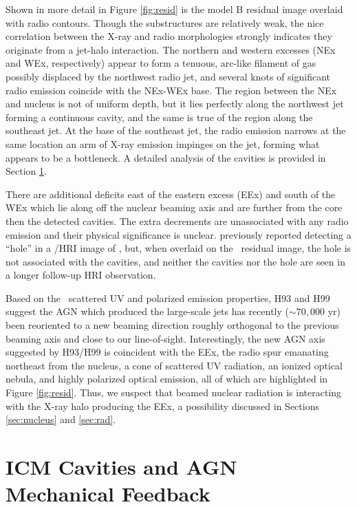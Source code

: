 \documentclass[useAMS,usenatbib]{mn2e}
\begin{document}
Shown in more detail in Figure \ref{fig:resid} is the model B residual
image overlaid with radio contours. Though the substructures are
relatively weak, the nice correlation between the X-ray and radio
morphologies strongly indicates they originate from a jet-halo
interaction. The northern and western excesses (NEx and WEx,
respectively) appear to form a tenuous, arc-like filament of gas
possibly displaced by the northwest radio jet, and several knots of
significant radio emission coincide with the NEx-WEx base. The region
between the NEx and nucleus is not of uniform depth, but it lies
perfectly along the northwest jet forming a continuous cavity, and the
same is true of the region along the southeast jet. At the base of the
southeast jet, the radio emission narrows at the same location an arm
of X-ray emission impinges on the jet, forming what appears to be a
bottleneck. A detailed analysis of the cavities is provided in Section
\ref{sec:cavs}.

There are additional deficits east of the eastern excess (EEx) and
south of the WEx which lie along off the nuclear beaming axis and are
further from the core then the detected cavities. The extra decrements
are unassociated with any radio emission and their physical
significance is unclear. \citet{1995MNRAS.274L..63F} previously
reported detecting a ``hole'' in a \rosat/HRI image of \irs, but, when
overlaid on the \cxo\ residual image, the hole is not associated with
the cavities, and neither the cavities nor the hole are seen in a
longer follow-up HRI observation.

Based on the \irs\ scattered UV and polarized emission properties, H93
and H99 suggest the AGN which produced the large-scale jets has
recently ($\sim 70,000$ yr) been reoriented to a new beaming direction
roughly orthogonal to the previous beaming axis and close to our
line-of-sight. Interestingly, the new AGN axis suggested by H93/H99 is
coincident with the EEx, the radio spur emanating northeast from the
nucleus, a cone of scattered UV radiation, an ionized optical nebula,
and highly polarized optical emission, all of which are highlighted in
Figure \ref{fig:resid}. Thus, we suspect that beamed nuclear radiation
is interacting with the X-ray halo producing the EEx, a possibility
discussed in Sections \ref{sec:nucleus} and \ref{sec:rad}.

\section{ICM Cavities and AGN Mechanical Feedback}
\label{sec:cavs}
\end{document}
